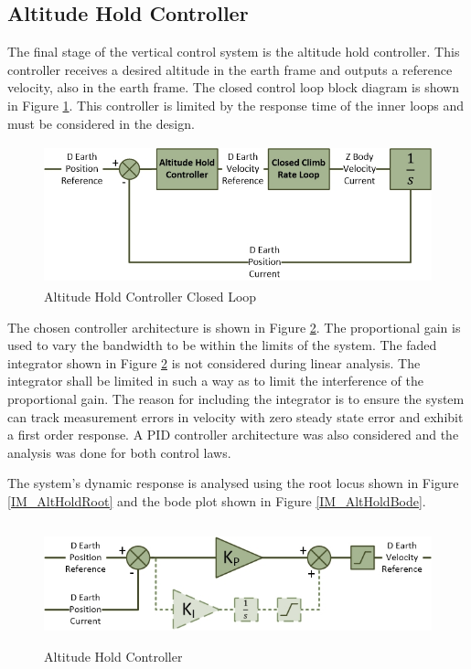 	 \subsection{Altitude Hold Controller}
	 The final stage of the vertical control system is the altitude hold controller. This controller receives a desired altitude in the earth frame and outputs a reference velocity, also in the earth frame. The closed control loop block diagram is shown in Figure \ref{IM_AltHoldControlLoop}. This controller is limited by the response time of the inner loops and must be considered in the design.
	 
	 \begin{figure}[H]
	 	\centering
	 	\includegraphics[height = 4cm]{../References/Diagrams/AltHoldLoop.jpg}
	 	\caption{Altitude Hold Controller Closed Loop}
	 	\label{IM_AltHoldControlLoop}
	 \end{figure}
	 
	 The chosen controller architecture is shown in Figure \ref{IM_AltHoldController}. The proportional gain is used to vary the bandwidth to be within the limits of the system. The faded integrator shown in Figure \ref{IM_AltHoldController} is not considered during linear analysis. The integrator shall be limited in such a way as to limit the interference of the proportional gain. The reason for including the integrator is to ensure the system can track measurement errors in velocity with zero steady state error and exhibit a first order response. A PID controller architecture was also considered and the analysis was done for both control laws.
	 
	 The system's dynamic response is analysed using the root locus shown in Figure \ref{IM_AltHoldRoot} and the bode plot shown in Figure \ref{IM_AltHoldBode}.
	 
	 \begin{figure}[H]
	 	\centering
	 	\includegraphics[height = 3.5cm]{../References/Diagrams/AltHoldController.jpg}
	 	\caption{Altitude Hold Controller}
	 	\label{IM_AltHoldController}
	 \end{figure}
	 
